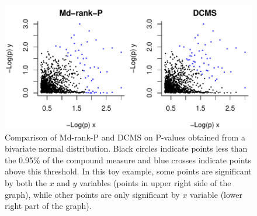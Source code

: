 \documentclass[12pt, oneside]{amsart}
\begin{document}
\newpage
\begin{figure}[h]
\begin{center}
\includegraphics[width=6in]{../figures_man2/S13-CompareMdRankPandDCMS.pdf}
\end{center}
\caption[]{Comparison of Md-rank-P and DCMS on P-values obtained from a bivariate normal distribution. Black circles indicate points less than the 0.95\% of the compound measure and blue crosses indicate points above this threshold. In this toy example, some points are significant by both the $x$ and $y$ variables (points in upper right side of the graph), while other points are only significant by $x$ variable (lower right part of the graph).}
 \label{fig:???}
\end{figure}
\end{document}
